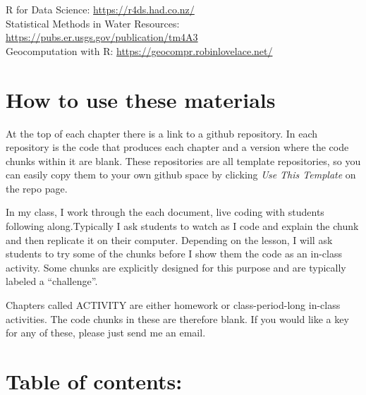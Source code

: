 \documentclass[
]{book}
\begin{document}
R for Data Science: \url{https://r4ds.had.co.nz/}\\
Statistical Methods in Water Resources: \url{https://pubs.er.usgs.gov/publication/tm4A3}\\
Geocomputation with R: \url{https://geocompr.robinlovelace.net/}

\hypertarget{how-to-use-these-materials}{%
\section{How to use these materials}\label{how-to-use-these-materials}}

At the top of each chapter there is a link to a github repository. In each repository is the code that produces each chapter and a version where the code chunks within it are blank. These repositories are all template repositories, so you can easily copy them to your own github space by clicking \emph{Use This Template} on the repo page.

In my class, I work through the each document, live coding with students following along.Typically I ask students to watch as I code and explain the chunk and then replicate it on their computer. Depending on the lesson, I will ask students to try some of the chunks before I show them the code as an in-class activity. Some chunks are explicitly designed for this purpose and are typically labeled a ``challenge''.

Chapters called ACTIVITY are either homework or class-period-long in-class activities. The code chunks in these are therefore blank. If you would like a key for any of these, please just send me an email.

\hypertarget{table-of-contents}{%
\section{Table of contents:}\label{table-of-contents}}
\end{document}
